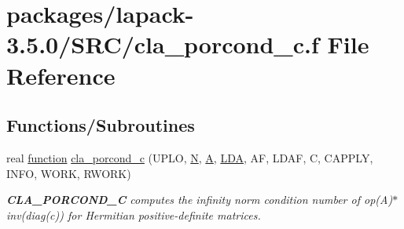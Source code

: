 \hypertarget{cla__porcond__c_8f}{}\section{packages/lapack-\/3.5.0/\+S\+R\+C/cla\+\_\+porcond\+\_\+c.f File Reference}
\label{cla__porcond__c_8f}
\subsection*{Functions/\+Subroutines}
\begin{DoxyCompactItemize}
\item 
real \hyperlink{afunc_8m_a7b5e596df91eadea6c537c0825e894a7}{function} \hyperlink{group__complexPOcomputational_gaa3a60feb87c68a34e9ef409d288af65c}{cla\+\_\+porcond\+\_\+c} (U\+P\+L\+O, \hyperlink{polmisc_8c_a0240ac851181b84ac374872dc5434ee4}{N}, \hyperlink{classA}{A}, \hyperlink{example__user_8c_ae946da542ce0db94dced19b2ecefd1aa}{L\+D\+A}, A\+F, L\+D\+A\+F, C, C\+A\+P\+P\+L\+Y, I\+N\+F\+O, W\+O\+R\+K, R\+W\+O\+R\+K)
\begin{DoxyCompactList}\small\item\em {\bfseries C\+L\+A\+\_\+\+P\+O\+R\+C\+O\+N\+D\+\_\+\+C} computes the infinity norm condition number of op(\+A)$\ast$inv(diag(c)) for Hermitian positive-\/definite matrices. \end{DoxyCompactList}\end{DoxyCompactItemize}
